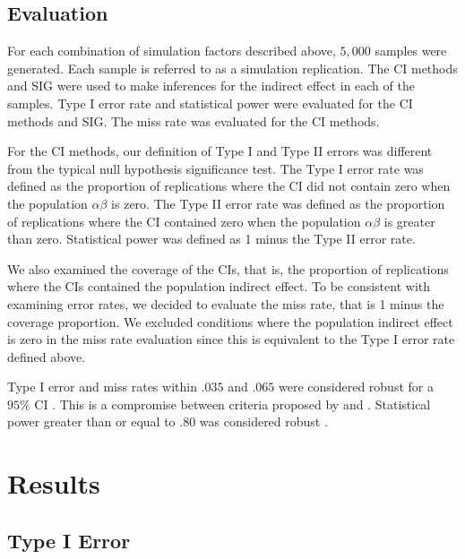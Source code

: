 \documentclass[man]{apa7}\usepackage[]{graphicx}\usepackage[]{xcolor}
\begin{document}
\subsection{Evaluation}

For each combination of simulation factors described above,
$5,000$ samples were generated.
Each sample is referred to as a simulation replication.
The CI methods and SIG were used to 
make inferences for the indirect effect in each of the samples.
Type I error rate and statistical power
were evaluated for the CI methods and SIG.
The miss rate was evaluated for the CI methods.

For the CI methods,
our definition of Type I and Type II errors was different from the typical null hypothesis significance test.
The Type I error rate was defined as the proportion of replications
where the CI did not contain zero
when the population $\alpha \beta$ is zero.
The Type II error rate was defined as the proportion of replications
where the CI contained zero
when the population $\alpha \beta$ is greater than zero.
Statistical power was defined as 1 minus the Type II error rate.

We also examined the coverage of the CIs,
that is,
the proportion of replications where the CIs
contained the population indirect effect.
To be consistent with examining error rates,
we decided to evaluate the miss rate,
that is 1 minus the coverage proportion.
We excluded conditions where the population indirect effect is zero
in the miss rate evaluation since this is equivalent to the Type I error rate defined above.

Type I error and miss rates within $.035$ and $.065$ were considered robust for a $95\%$ CI
\parencite{Lib-Simulation-Robustness-Serlin-2000}.
This is a compromise between criteria proposed by
\Textcite{Lib-Simulation-Robustness-Cochran-1952}
and
\Textcite{Lib-Simulation-Robustness-Bradley-1978}.
Statistical power greater than or equal to
$.80$
was considered robust
\parencite{Lib-NHST-Power-Books-Cohen-1988}.

\section{Results}

\subsection{Type I Error}
\end{document}
